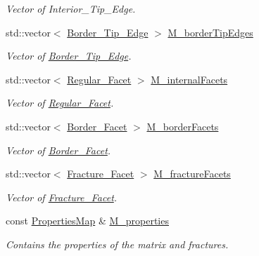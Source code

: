 \begin{DoxyCompactItemize}
\begin{DoxyCompactList}\small\item\em Vector of Interior\+\_\+\+Tip\+\_\+\+Edge. \end{DoxyCompactList}\item 
std\+::vector$<$ \hyperlink{classFVCode3D_1_1Rigid__Mesh_1_1Border__Tip__Edge}{Border\+\_\+\+Tip\+\_\+\+Edge} $>$ \hyperlink{classFVCode3D_1_1Rigid__Mesh_a712ea50f5237025e92af21799c5ec31b}{M\+\_\+border\+Tip\+Edges}
\begin{DoxyCompactList}\small\item\em Vector of \hyperlink{classFVCode3D_1_1Rigid__Mesh_1_1Border__Tip__Edge}{Border\+\_\+\+Tip\+\_\+\+Edge}. \end{DoxyCompactList}\item 
std\+::vector$<$ \hyperlink{classFVCode3D_1_1Rigid__Mesh_1_1Regular__Facet}{Regular\+\_\+\+Facet} $>$ \hyperlink{classFVCode3D_1_1Rigid__Mesh_a8ede7966973fec708327b95fc379a4e1}{M\+\_\+internal\+Facets}
\begin{DoxyCompactList}\small\item\em Vector of \hyperlink{classFVCode3D_1_1Rigid__Mesh_1_1Regular__Facet}{Regular\+\_\+\+Facet}. \end{DoxyCompactList}\item 
std\+::vector$<$ \hyperlink{classFVCode3D_1_1Rigid__Mesh_1_1Border__Facet}{Border\+\_\+\+Facet} $>$ \hyperlink{classFVCode3D_1_1Rigid__Mesh_a21700f8c7b816da944a829ee9d3ab7fb}{M\+\_\+border\+Facets}
\begin{DoxyCompactList}\small\item\em Vector of \hyperlink{classFVCode3D_1_1Rigid__Mesh_1_1Border__Facet}{Border\+\_\+\+Facet}. \end{DoxyCompactList}\item 
std\+::vector$<$ \hyperlink{classFVCode3D_1_1Rigid__Mesh_1_1Fracture__Facet}{Fracture\+\_\+\+Facet} $>$ \hyperlink{classFVCode3D_1_1Rigid__Mesh_acaff9da1f03f04f7012cf372f8f27cd6}{M\+\_\+fracture\+Facets}
\begin{DoxyCompactList}\small\item\em Vector of \hyperlink{classFVCode3D_1_1Rigid__Mesh_1_1Fracture__Facet}{Fracture\+\_\+\+Facet}. \end{DoxyCompactList}\item 
const \hyperlink{classFVCode3D_1_1PropertiesMap}{Properties\+Map} \& \hyperlink{classFVCode3D_1_1Rigid__Mesh_a6affc34229309c2b58be292fc01bb1fc}{M\+\_\+properties}
\begin{DoxyCompactList}\small\item\em Contains the properties of the matrix and fractures. \end{DoxyCompactList}\item 

\end{DoxyCompactItemize}
